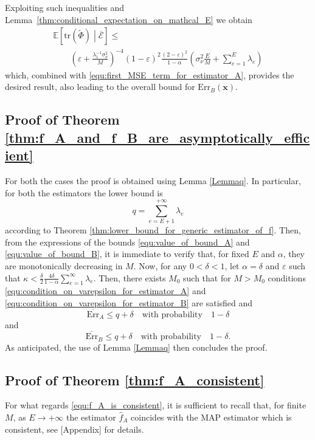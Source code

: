 \documentclass[10pt,twocolumn,twoside]{IEEEtran}					%
\theoremstyle	{plain}
\newcommand{\TraceOf}				[1]	{\mathrm{tr} \left( #1 \right)}
\newcommand{\Expectation}					[0]	{\mathbb{E}}
\newcommand{\ExpectationOf}					[1]	{\Expectation \left[ #1 \right]}
\newcommand{\ExpectationOfGiven}			[2]	{\ExpectationOf{ #1 \; \left| \; #2 \right. }}
\newcommand	{\Lemma}				[0]	{Lemma}
\begin{document}
Exploiting such inequalities and \Lemma~\ref{thm:conditional_expectation_on_mathcal_E} we obtain    
$$
\begin{array}{l}
	\ExpectationOfGiven{\TraceOf{\widetilde{\Phi}}}{\overline{\mathcal{E}}}
	\leq \\
	\displaystyle
	\qquad 
	\left(\varepsilon + \frac{\lambda_1^{-1} \sigma_{\nu}^2}{M} \right)^{-4}
	(1-\varepsilon)^2
	\frac{(2-\varepsilon)^2}{1-\alpha}
	\left(\sigma_{\nu}^2\frac{E}{M} + \sum_{e=1}^E \lambda_e \right)
\end{array}
$$
which, combined with \eqref{equ:first_MSE_term_for_estimator_A}, provides the desired result, also leading to the overall bound for $\mathrm{Err}_{B}(\bm{x})$.


\subsection{Proof of Theorem \ref{thm:f_A_and_f_B_are_asymptotically_efficient}} {}

For both the cases the proof is obtained using Lemma \ref{Lemmaq}. In particular, for both the estimators the lower bound is 
$$
q=\sum_{e = E + 1}^{+\infty} \lambda_{e}
$$
according to Theorem \ref{thm:lower_bound_for_generic_estimator_of_f}. Then, from the expressions of the bounds \eqref{equ:value_of_bound_A} and \eqref{equ:value_of_bound_B}, it is immediate to verify that, for fixed $E$ and $\alpha$, they are monotonically decreasing in $M$. Now, for any $0<\delta<1$, let $\alpha=\delta$ and $\varepsilon$ such that $\kappa<\frac{\delta}{2}\frac{4\delta}{1-\alpha}\sum_{e=1}^\infty \lambda_e$. Then, there exists $M_0$ such that for $M>M_0$ conditions \eqref{equ:condition_on_varepsilon_for_estimator_A} and \eqref{equ:condition_on_varepsilon_for_estimator_B} are satisfied and 
$$
\overline{\mathrm{Err}}_{A} \leq q + \delta \quad \text{with probability} \quad 1 - \delta
$$ 
and
$$
\overline{\mathrm{Err}}_{B} \leq q + \delta \quad \text{with probability} \quad 1 - \delta.
$$
As anticipated, the use of Lemma \ref{Lemmaq} then concludes the proof. 


\subsection{Proof of Theorem \ref{thm:f_A_consistent}} 

For what regards \eqref{equ:f_A_is_consistent}, it is sufficient to recall that, for finite $M$, as $E \rightarrow +\infty$ the estimator $\widehat{f}_{A}$ coincides with the \ac{MAP} estimator which is consistent, see \cite{pillonetto_bell__2007__bayes_and_empirical_bayes_semi-blind_deconvolution_using_eigenfunctions_of_a_prior_covariance}[Appendix] for details.
\end{document}
